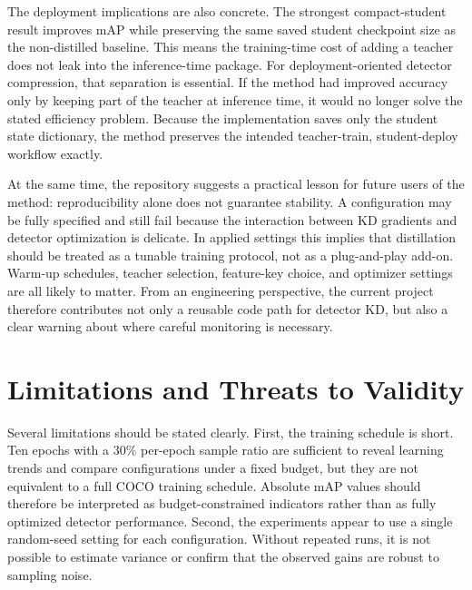 The deployment implications are also concrete. The strongest compact-student result improves mAP while preserving the same saved student checkpoint size as the non-distilled baseline. This means the training-time cost of adding a teacher does not leak into the inference-time package. For deployment-oriented detector compression, that separation is essential. If the method had improved accuracy only by keeping part of the teacher at inference time, it would no longer solve the stated efficiency problem. Because the implementation saves only the student state dictionary, the method preserves the intended teacher-train, student-deploy workflow exactly.

At the same time, the repository suggests a practical lesson for future users of the method: reproducibility alone does not guarantee stability. A configuration may be fully specified and still fail because the interaction between KD gradients and detector optimization is delicate. In applied settings this implies that distillation should be treated as a tunable training protocol, not as a plug-and-play add-on. Warm-up schedules, teacher selection, feature-key choice, and optimizer settings are all likely to matter. From an engineering perspective, the current project therefore contributes not only a reusable code path for detector KD, but also a clear warning about where careful monitoring is necessary.

\section{Limitations and Threats to Validity}

Several limitations should be stated clearly. First, the training schedule is short. Ten epochs with a $30\%$ per-epoch sample ratio are sufficient to reveal learning trends and compare configurations under a fixed budget, but they are not equivalent to a full COCO training schedule. Absolute mAP values should therefore be interpreted as budget-constrained indicators rather than as fully optimized detector performance. Second, the experiments appear to use a single random-seed setting for each configuration. Without repeated runs, it is not possible to estimate variance or confirm that the observed gains are robust to sampling noise.

